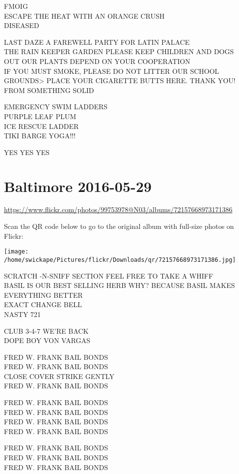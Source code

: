 \documentclass[10pt,letterpaper]{article}
\begin{document}
FMOIG\\
ESCAPE THE HEAT WITH AN ORANGE CRUSH\\
DISEASED

LAST DAZE A FAREWELL PARTY FOR LATIN PALACE\\
THE RAIN KEEPER GARDEN PLEASE KEEP CHILDREN AND DOGS OUT OUR PLANTS DEPEND ON YOUR COOPERATION\\
IF YOU MUST SMOKE, PLEASE DO NOT LITTER OUR SCHOOL GROUNDS>  PLACE YOUR CIGARETTE BUTTS HERE.  THANK YOU!\\
FROM SOMETHING SOLID

EMERGENCY SWIM LADDERS\\
PURPLE LEAF PLUM\\
ICE RESCUE LADDER\\
TIKI BARGE YOGA!!!

YES YES YES


\section*{Baltimore 2016-05-29}

\url{https://www.flickr.com/photos/99753978@N03/albums/72157668973171386}

Scan the QR code below to go to the original album with full-size photos on Flickr:

\texttt{[image: /home/swickape/Pictures/flickr/Downloads/qr/72157668973171386.jpg]}


SCRATCH {-}N{-}SNIFF SECTION FEEL FREE TO TAKE A WHIFF\\
BASIL IS OUR BEST SELLING HERB WHY?  BECAUSE BASIL MAKES EVERYTHING BETTER\\
EXACT CHANGE BELL\\
NASTY 721

CLUB 3{-}4{-}7 WE'RE BACK\\
DOPE BOY VON VARGAS

FRED W. FRANK BAIL BONDS\\
FRED W. FRANK BAIL BONDS\\
CLOSE COVER STRIKE GENTLY\\
FRED W. FRANK BAIL BONDS

FRED W. FRANK BAIL BONDS\\
FRED W. FRANK BAIL BONDS\\
FRED W. FRANK BAIL BONDS\\
FRED W. FRANK BAIL BONDS

FRED W. FRANK BAIL BONDS\\
FRED W. FRANK BAIL BONDS\\
FRED W. FRANK BAIL BONDS
\end{document}
